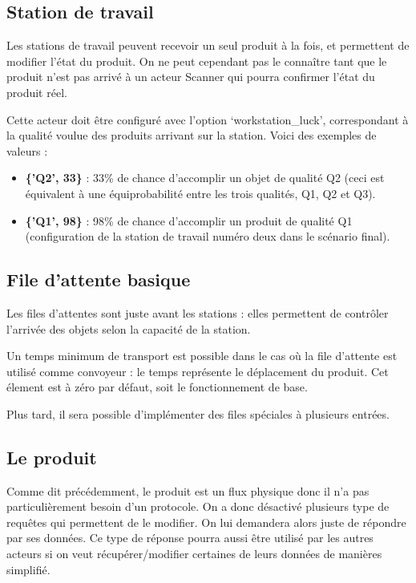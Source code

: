 \documentclass[12pt,a4paper]{article}
\begin{document}
		\subsection{Station de travail}
			Les stations de travail peuvent recevoir un seul produit à la fois, 
			et permettent de modifier l'état du produit. On ne peut cependant
			pas le conna\^itre tant que le produit n'est pas arrivé à un acteur
			Scanner qui pourra confirmer l'état du produit réel.

			Cette acteur doit \^etre configuré avec l'option `workstation\_luck',
			correspondant à la qualité voulue des produits arrivant sur la
			station. Voici des exemples de valeurs :

			\begin{itemize}
				\item \textbf{\{'Q2', 33\}} : 33\% de chance d'accomplir un 
					objet de qualité Q2 (ceci est équivalent à une 
					équiprobabilité entre les trois qualités, Q1, Q2 et Q3).
				\item \textbf{\{'Q1', 98\}} : 98\% de chance d'accomplir un
					produit de qualité Q1 (configuration de la station de
					travail numéro deux dans le scénario final).
			\end{itemize}

		\subsection{File d'attente basique}
			Les files d'attentes sont juste avant les stations : elles 
			permettent de contrôler l'arrivée des objets selon la capacité
			de la station.

			Un temps minimum de transport est possible dans le cas où la file 
			d'attente est utilisé comme convoyeur : le temps représente le
			déplacement du produit. Cet élement est à zéro par défaut, soit le 
			fonctionnement de base.

			Plus tard, il sera possible d'implémenter des files spéciales à
			plusieurs entrées.
		 
		\subsection{Le produit}
			 Comme dit précédemment, le produit est un flux physique donc il 
			 n'a pas particulièrement besoin d'un protocole. On a donc désactivé
			 plusieurs type de requêtes qui permettent de le modifier. 
			 On lui demandera alors juste de répondre par ses données. 
			 Ce type de réponse pourra aussi être utilisé par les autres acteurs 
			 si on veut récupérer/modifier certaines de leurs données de 
			 manières simplifié.
\end{document}
